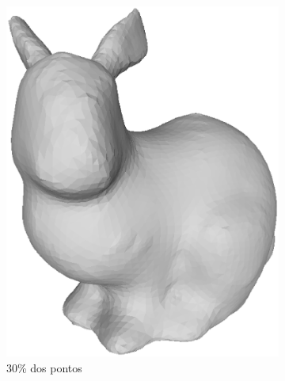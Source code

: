 \begin{figure}[H]
\begin{subfigure}[b]{0.47\textwidth}
		\includegraphics[width=\textwidth]{imagens/cap4/bunny_30.eps}
		\caption{30\% dos pontos}
		\label{fig:ex43}
	\end{subfigure}
	\hfill
	\begin{subfigure}[b]{0.47\textwidth}
		\centering

\end{subfigure}
\end{figure}
